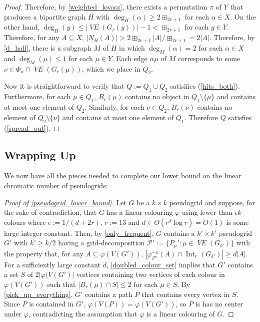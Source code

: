 \documentclass{patmorin}
\newcommand{\vol}[1]{\boxplus_{#1}}
\DeclareMathOperator{\interior}{Int}
\DeclareMathOperator{\VE}{\mathit{VE}}
\begin{document}
\begin{proof}
  Therefore, by \cref{weighted_lovasz}, there exists a permutation $\pi$ of $Y$ that produces a bipartite graph $H$ with $\deg_H(\alpha)\ge {2\vol{2r+1}}$ for each $\alpha\in X$.  On the other hand, $\deg_{H}(y)\le |\VE(G_r(y))|-1 < {\vol{2r+1}}$ for each $y\in Y$.  Therefore, for any $A\subseteq X$, $|N_H(A)|> {2\vol{2r+1}}|A|/{\vol{2r+1}} = 2|A|$.  Therefore, by \cref{d_hall}, there is a subgraph $M$ of $H$ in which $\deg_M(\alpha)=2$ for each $\alpha\in X$ and $\deg_M(\mu)\le 1$ for each $\mu\in Y$. Each edge $\alpha\mu$ of $M$ corresponds to some $\nu\in\Phi_\alpha\cap\VE(G_r(\mu))$, which we place in $Q_2$.

  Now it is straightforward to verify that $Q:=Q_1\cup Q_2$ satisifies (\ref{hits_both}).  Furthermore, for each $\mu\in Q_1$, $B_r(\mu)$ contains no object in $Q_1\setminus\{\mu\}$ and contains at most one element of $Q_2$.  Similarly, for each $\nu\in Q_2$, $B_r(\nu)$ contains no element of $Q_2\setminus\{\nu\}$ and contains at most one element of $Q_1$.  Therefore $Q$ satisfies (\ref{spread_out}).
\end{proof}

\subsection{Wrapping Up}
\label{wrapping_up}

We now have all the pieces needed to complete our lower bound on the linear chromatic number of pseudogrids:

\begin{proof}[Proof of \cref{pseudogrid_lower_bound}]
  Let $G$ be a $k\times k$ pseudogrid and suppose, for the sake of contradiction, that $G$ has a linear colouring $\varphi$ using fewer than $\epsilon k$ colours where $\epsilon:=1/(d+2r)$, $r:= 13$ and $d\in O(r^4\log r)=O(1)$ is some large integer constant.  Then, by \cref{only_frequent}, $G$ contains a $k'\times k'$ pseudogrid $G'$ with $k'\ge k/2$ having a grid-decomposition $\mathcal{P}':=\{P_\mu':\mu\in \VE(G_{k'})\}$ with the property that, for any $A\subseteq\varphi(V(G'))$, $|\varphi^{-1}_{\mathcal{P'}}(A)\cap\interior_r(G_{k'})|\ge d|A|$.  For a sufficiently large constant $d$, \cref{doubled_colour_set} implies that $G'$ contains a set $S$ of $2|\varphi(V(G')|$ vertices containing two vertices of each colour in $\varphi(V(G'))$ such that $|B_r(\mu)\cap S|\le 2$ for each $\mu\in S$.  By \cref{pick_up_everything}, $G'$ contains a path $P$ that contains every vertex in $S$.  Since $P$ is contained in $G'$, $\varphi(V(P))=\varphi(V(G'))$, so $P$ is has no center under $\varphi$, contradicting the assumption that $\varphi$ is a linear colouring of $G$.
\end{proof}
\end{document}
